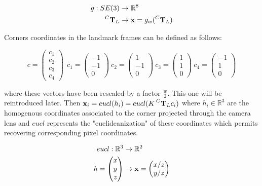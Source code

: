 \documentclass[11pt]{article}
\newcommand{\T}[2]{\prescript{#1}{}{\bfT}_{#2}}
\newcommand{\Reals}{\mathbb{R}}
\begin{document}
\begin{equation}
    \begin{split}
        g: SE(3) &\rightarrow \Reals^8 \\
                           \T{C}{L} &\rightarrow \bfx = g_w(\T{C}{L})
    \end{split}
\end{equation}


Corners coordinates in the landmark frames can be defined as follows:

\begin{equation}
    c =
    \begin{pmatrix}
    c_1 \\ c_2 \\ c_3 \\ c_4
    \end{pmatrix}
    ~~
    c_1 =  \begin{pmatrix} -1 \\ -1 \\ 0 \end{pmatrix}
    ~ 
    c_2 =  \begin{pmatrix} 1 \\ -1 \\ 0 \end{pmatrix}
    ~
    c_3 =  \begin{pmatrix} 1 \\ 1 \\ 0 \end{pmatrix}
    ~
    c_4 =  \begin{pmatrix} -1 \\ 1 \\ 0 \end{pmatrix}
\end{equation}

where these vectors have been rescaled by a factor $\frac{w}{2}$. This one will be reintroduced later.
Then $\bfx_i = eucl(h_i) = eucl(K\T{C}{L} c_i)$
where $h_i \in \Reals^3$ are the homogenous coordinates associated to the corner projected through the camera lens and $eucl$ represents the "euclideanization" of these coordinates which permits recovering corresponding pixel coordinates. 

\begin{equation}
    \begin{split}
        eucl: \Reals^3 &\rightarrow \Reals^2 \\
                           h = \begin{pmatrix}x\\y\\z\end{pmatrix} &\rightarrow \bfx = \begin{pmatrix}x/z\\y/z\end{pmatrix}
    \end{split}
\end{equation}
\end{document}
